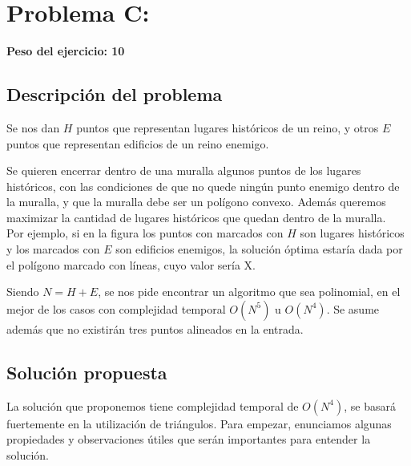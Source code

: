 \newpage{}
\section{Problema C: }
\textbf{Peso del ejercicio: 10}

\subsection{Descripción del problema}
Se nos dan $H$ puntos que representan lugares históricos de un reino, 
y otros $E$ puntos que representan edificios de un reino enemigo. 

Se quieren encerrar dentro de una muralla algunos puntos de los lugares históricos, 
con las condiciones de que no quede ningún punto enemigo dentro de la muralla, 
y que la muralla debe ser un polígono convexo. Además queremos maximizar la cantidad 
de lugares históricos que quedan dentro de la muralla. \\

Por ejemplo, si en la figura los puntos con marcados con $H$ son lugares históricos 
y los marcados con $E$ son edificios enemigos, la solución óptima estaría dada por 
el polígono marcado con líneas, cuyo valor sería X. 

Siendo $N = H + E$, se nos pide encontrar un algoritmo que sea polinomial, en el mejor 
de los casos con complejidad temporal $O(N^5)$ u $O(N^4)$. Se asume además que no existirán 
tres puntos alineados en la entrada. 

\subsection{Solución propuesta}

La solución que proponemos tiene complejidad temporal de $O(N^4)$, se basará fuertemente 
en la utilización de triángulos. Para empezar, enunciamos algunas propiedades y observaciones 
útiles que serán importantes para entender la solución. 

